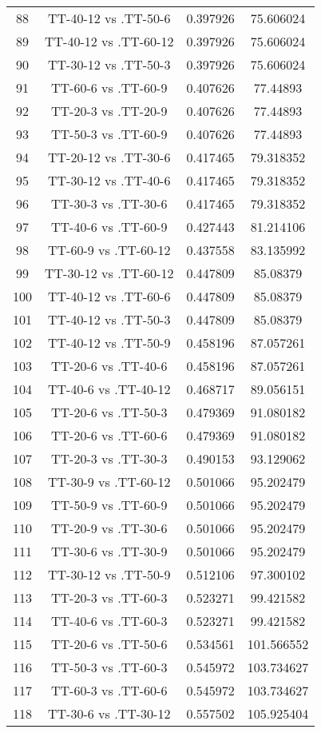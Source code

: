 \documentclass[a4paper,10pt]{article}
\begin{document}
\begin{landscape}
\begin{table}[!htp]
\begin{tabular}{cccc}
88&TT-40-12 vs .TT-50-6&0.397926&75.606024\\
89&TT-40-12 vs .TT-60-12&0.397926&75.606024\\
90&TT-30-12 vs .TT-50-3&0.397926&75.606024\\
91&TT-60-6 vs .TT-60-9&0.407626&77.44893\\
92&TT-20-3 vs .TT-20-9&0.407626&77.44893\\
93&TT-50-3 vs .TT-60-9&0.407626&77.44893\\
94&TT-20-12 vs .TT-30-6&0.417465&79.318352\\
95&TT-30-12 vs .TT-40-6&0.417465&79.318352\\
96&TT-30-3 vs .TT-30-6&0.417465&79.318352\\
97&TT-40-6 vs .TT-60-9&0.427443&81.214106\\
98&TT-60-9 vs .TT-60-12&0.437558&83.135992\\
99&TT-30-12 vs .TT-60-12&0.447809&85.08379\\
100&TT-40-12 vs .TT-60-6&0.447809&85.08379\\
101&TT-40-12 vs .TT-50-3&0.447809&85.08379\\
102&TT-40-12 vs .TT-50-9&0.458196&87.057261\\
103&TT-20-6 vs .TT-40-6&0.458196&87.057261\\
104&TT-40-6 vs .TT-40-12&0.468717&89.056151\\
105&TT-20-6 vs .TT-50-3&0.479369&91.080182\\
106&TT-20-6 vs .TT-60-6&0.479369&91.080182\\
107&TT-20-3 vs .TT-30-3&0.490153&93.129062\\
108&TT-30-9 vs .TT-60-12&0.501066&95.202479\\
109&TT-50-9 vs .TT-60-9&0.501066&95.202479\\
110&TT-20-9 vs .TT-30-6&0.501066&95.202479\\
111&TT-30-6 vs .TT-30-9&0.501066&95.202479\\
112&TT-30-12 vs .TT-50-9&0.512106&97.300102\\
113&TT-20-3 vs .TT-60-3&0.523271&99.421582\\
114&TT-40-6 vs .TT-60-3&0.523271&99.421582\\
115&TT-20-6 vs .TT-50-6&0.534561&101.566552\\
116&TT-50-3 vs .TT-60-3&0.545972&103.734627\\
117&TT-60-3 vs .TT-60-6&0.545972&103.734627\\
118&TT-30-6 vs .TT-30-12&0.557502&105.925404\\

\end{tabular}
\end{table}
\end{landscape}
\end{document}
